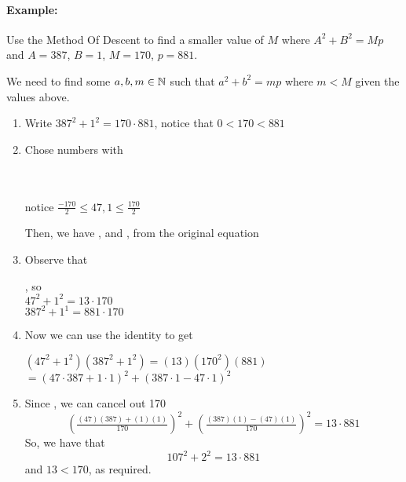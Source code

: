 \documentclass[../main.tex]{subfiles}
\begin{document}
\paragraph{Example:} Use the Method Of Descent to find a smaller value of $M$ where $A^2+B^2=Mp$ and $A=387$, $B=1$, $M=170$, $p=881$.
\begin{ans}
    We need to find some $a,b,m \in \mathbb{N}$ such that $a^2+b^2=mp$ where $m < M$ given the values above.
    \begin{enumerate}
        \item Write $387^2+1^2=170\cdot881$, notice that $0 < 170 < 881$
        \item Chose numbers with
            \begin{center}
                 \\
                 \\
                notice $\tfrac{-170}{2} \leq 47,1 \leq \tfrac{170}{2}$
            \end{center}
            Then, we have , and , from the original equation
        \item Observe that
            \begin{center}
                , so \\
                $47^2+1^2=13\cdot170$ \\
                $387^2+1^1=881\cdot170$
            \end{center}
    \end{enumerate}
\end{ans}
\begin{ans}
    \begin{enumerate}
    \setcounter{enumi}{3}
        \item Now we can use the identity to get
            \begin{center}
                $(47^2+1^2)(387^2+1^2)=(13)(170^2)(881)$ \\
                $=(47\cdot387+1\cdot1)^2+(387\cdot1-47\cdot1)^2$
            \end{center}
        \item Since , we can cancel out 170
        $$(\tfrac{(47)(387)+(1)(1)}{170})^2+(\tfrac{(387)(1)-(47)(1)}{170})^2=13\cdot881$$ So, we have that $$107^2+2^2=13\cdot881$$ and $13 < 170$, as required.
    \end{enumerate}
\end{ans}
\end{document}
